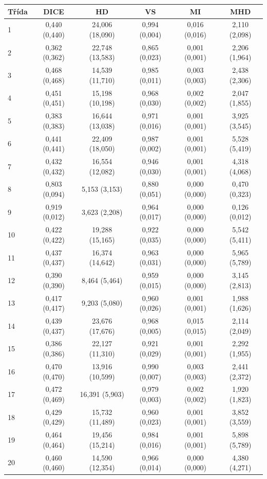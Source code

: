 \begin{tabular}{l c c c c c}
 \hline
Třída & DICE & HD & VS & MI & MHD \\ \hline
1 & 0,440 (0,440) & 24,006 (18,090) & 0,994 (0,004) & 0,016 (0,016) & 2,110 (2,098) \\
2 & 0,362 (0,362) & 22,748 (13,583) & 0,865 (0,023) & 0,001 (0,001) & 2,206 (1,964) \\
3 & 0,468 (0,468) & 14,539 (11,710) & 0,985 (0,011) & 0,003 (0,003) & 2,438 (2,306) \\
4 & 0,451 (0,451) & 15,198 (10,198) & 0,968 (0,030) & 0,002 (0,002) & 2,047 (1,855) \\
5 & 0,383 (0,383) & 16,644 (13,038) & 0,971 (0,016) & 0,001 (0,001) & 3,925 (3,545) \\
6 & 0,441 (0,441) & 22,409 (18,050) & 0,987 (0,002) & 0,001 (0,001) & 5,528 (5,419) \\
7 & 0,432 (0,432) & 16,554 (12,082) & 0,946 (0,030) & 0,001 (0,001) & 4,318 (4,068) \\
8 & 0,803 (0,094) & 5,153 (3,153) & 0,880 (0,051) & 0,000 (0,000) & 0,470 (0,323) \\
9 & 0,919 (0,012) & 3,623 (2,208) & 0,964 (0,017) & 0,000 (0,000) & 0,126 (0,012) \\
10 & 0,422 (0,422) & 19,288 (15,165) & 0,922 (0,035) & 0,000 (0,000) & 5,542 (5,411) \\
11 & 0,437 (0,437) & 16,374 (14,642) & 0,963 (0,031) & 0,000 (0,000) & 5,965 (5,789) \\
12 & 0,390 (0,390) & 8,464 (5,464) & 0,959 (0,015) & 0,000 (0,000) & 3,145 (2,813) \\
13 & 0,417 (0,417) & 9,203 (5,080) & 0,960 (0,026) & 0,001 (0,001) & 1,988 (1,626) \\
14 & 0,439 (0,437) & 23,676 (17,676) & 0,968 (0,005) & 0,015 (0,015) & 2,114 (2,049) \\
15 & 0,386 (0,386) & 22,127 (11,310) & 0,921 (0,029) & 0,001 (0,001) & 2,292 (1,955) \\
16 & 0,470 (0,470) & 13,916 (10,599) & 0,990 (0,007) & 0,003 (0,003) & 2,441 (2,372) \\
17 & 0,472 (0,469) & 16,391 (5,903) & 0,979 (0,003) & 0,002 (0,002) & 1,920 (1,823) \\
18 & 0,429 (0,429) & 15,732 (11,489) & 0,960 (0,023) & 0,001 (0,001) & 3,852 (3,559) \\
19 & 0,464 (0,464) & 19,456 (15,214) & 0,984 (0,016) & 0,001 (0,001) & 5,898 (5,789) \\
20 & 0,460 (0,460) & 14,590 (12,354) & 0,966 (0,014) & 0,000 (0,000) & 4,380 (4,271) \\

\end{tabular}
